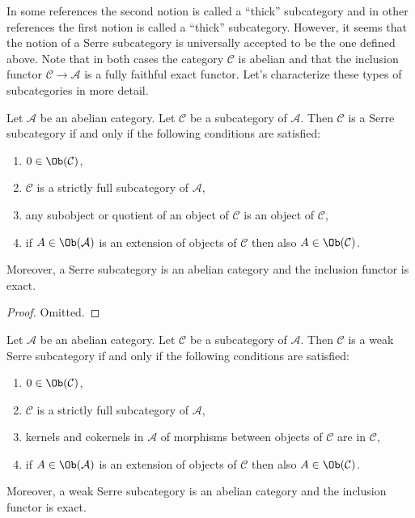 \noindent
In some references the second notion is called a ``thick'' subcategory
and in other references the first notion is called a ``thick'' subcategory.
However, it seems that the notion of a Serre subcategory is universally
accepted to be the one defined above. Note that in both cases the category
$\mathcal{C}$ is abelian and that the inclusion functor
$\mathcal{C} \to \mathcal{A}$ is a fully faithful exact functor.
Let's characterize these types of subcategories in more detail.

\begin{lemma}
\label{lemma-characterize-serre-subcategory}
Let $\mathcal{A}$ be an abelian category.
Let $\mathcal{C}$ be a subcategory of $\mathcal{A}$.
Then $\mathcal{C}$ is a Serre subcategory if and only if
the following conditions are satisfied:
\begin{enumerate}
\item $0 \in \Ob(\mathcal{C})$,
\item $\mathcal{C}$ is a strictly full subcategory of $\mathcal{A}$,
\item any subobject or quotient of an object of $\mathcal{C}$ is an object
of $\mathcal{C}$,
\item if $A \in \Ob(\mathcal{A})$ is an extension of objects of $\mathcal{C}$
then also $A \in \Ob(\mathcal{C})$.
\end{enumerate}
Moreover, a Serre subcategory is an abelian category and
the inclusion functor is exact.
\end{lemma}

\begin{proof}
Omitted.
\end{proof}

\begin{lemma}
\label{lemma-characterize-weak-serre-subcategory}
Let $\mathcal{A}$ be an abelian category.
Let $\mathcal{C}$ be a subcategory of $\mathcal{A}$.
Then $\mathcal{C}$ is a weak Serre subcategory if and only if
the following conditions are satisfied:
\begin{enumerate}
\item $0 \in \Ob(\mathcal{C})$,
\item $\mathcal{C}$ is a strictly full subcategory of $\mathcal{A}$,
\item kernels and cokernels in $\mathcal{A}$ of morphisms
between objects of $\mathcal{C}$ are in $\mathcal{C}$,
\item if $A \in \Ob(\mathcal{A})$ is an extension of objects of $\mathcal{C}$
then also $A \in \Ob(\mathcal{C})$.
\end{enumerate}
Moreover, a weak Serre subcategory is an abelian category and
the inclusion functor is exact.
\end{lemma}

